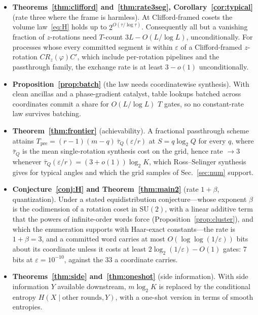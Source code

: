 \documentclass[aps,prx,twocolumn,superscriptaddress,nofootinbib,longbibliography]{revtex4-2}
\theoremstyle{plain}
\theoremstyle{definition}
\theoremstyle{remark}
\newcommand{\Tpre}{T_{\mathrm{pre}}}
\newcommand{\SU}{\mathrm{SU}(2)}
\begin{document}
\begin{itemize}
\item \textbf{Theorems~\ref{thm:clifford} and~\ref{thm:rate3seg}, Corollary~\ref{cor:typical}} (rate three where the frame is harmless). At Clifford-framed cosets the volume law~\eqref{eq:H} holds up to $2^{O(\tau/\log\tau)}$. Consequently all but a vanishing fraction of $z$-rotations need $T$-count $3L-O(L/\log L)$, unconditionally. For processes whose every committed segment is within $\varepsilon$ of a Clifford-framed $z$-rotation $CR_z(\varphi)C'$, which include per-rotation pipelines and the passthrough family, the exchange rate is at least $3-o(1)$ unconditionally.
\item \textbf{Proposition~\ref{prop:batch}} (the law needs coordinatewise synthesis). With clean ancillas and a phase-gradient catalyst, table lookups batched across coordinates commit a share for $O(L/\log L)$ $T$ gates, so no constant-rate law survives batching.
\item \textbf{Theorem~\ref{thm:frontier}} (achievability). A fractional passthrough scheme attains $\Tpre=(r-1)(m-q)\,\bar\tau_Q(\varepsilon/r)$ at $S=q\log_2Q$ for every $q$, where $\bar\tau_Q$ is the mean single-rotation synthesis cost on the grid, hence rate $\to3$ whenever $\bar\tau_Q(\varepsilon/r)=(3+o(1))\log_2K$, which Ross--Selinger synthesis gives for typical angles and which the grid samples of Sec.~\ref{sec:num} support.
\item \textbf{Conjecture~\ref{conj:H} and Theorem~\ref{thm:main2}} (rate $1+\beta$, quantization). Under a stated equidistribution conjecture---whose exponent $\beta$ is the codimension of a rotation coset in $\SU$, with a linear additive term that the powers of infinite-order words force (Proposition~\ref{prop:cluster}), and which the enumeration supports with Haar-exact constants---the rate is $1+\beta=3$, and a committed word carries at most $O(\log\log(1/\varepsilon))$ bits about its coordinate unless it costs at least $2\log_2(1/\varepsilon)-O(1)$ gates: $7$ bits at $\varepsilon=10^{-10}$, against the $33$ a coordinate carries.
\item \textbf{Theorems~\ref{thm:side} and~\ref{thm:oneshot}} (side information). With side information $Y$ available downstream, $m\log_2K$ is replaced by the conditional entropy $H(X\mid\text{other rounds},Y)$, with a one-shot version in terms of smooth entropies.
\end{itemize}
\end{document}
